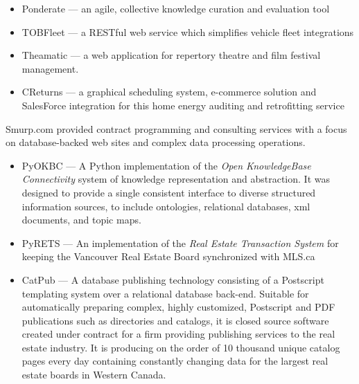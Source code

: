 \documentclass[line,margin,hidelinks]{res}
\begin{document}
\begin{resume}
\begin{position}
\begin{itemize}
  \item Ponderate --- an agile, collective knowledge curation and evaluation tool
  \item TOBFleet --- a RESTful web service which simplifies vehicle fleet integrations
  \item Theamatic --- a web application for repertory theatre and film
    festival management.
  \item CReturns --- a graphical scheduling system, e-commerce
    solution and SalesForce integration for this home energy auditing and
    retrofitting service
\end{itemize}
\end{position}


\begin{position}
Smurp.com provided contract programming and consulting services with a focus
on database-backed web sites and complex data processing operations.

\begin{itemize}

  \item PyOKBC --- A Python implementation of the
     \emph{Open KnowledgeBase Connectivity}
  system of knowledge representation and abstraction.
  It was designed to provide a single consistent interface to diverse structured
  information sources, to include ontologies, relational databases,
  xml documents, and topic maps. %

  \item PyRETS --- An implementation of the \emph{Real Estate Transaction System}
  for keeping the Vancouver Real Estate Board synchronized with MLS.ca

  \item CatPub --- A database publishing technology consisting of a
  Postscript templating system over a relational database back-end.
  Suitable for automatically preparing complex, highly customized,
  Postscript and PDF publications such as directories and catalogs,
  it is closed source software created under contract for a firm
  providing publishing services to the real estate industry.
  It is producing on the order of 10 thousand unique catalog pages
  every day containing constantly changing data for the largest
  real estate boards in Western Canada.


\end{itemize}
\end{position}
\end{resume}
\end{document}
